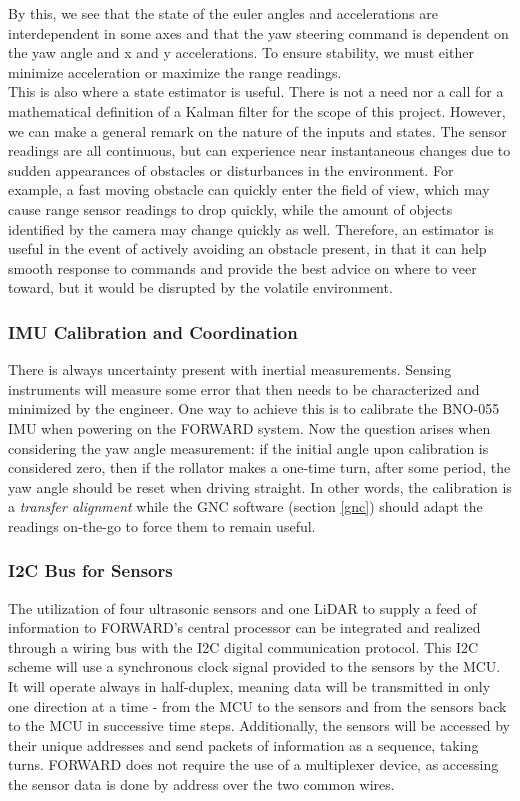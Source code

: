 \noindent By this, we see that the state of the euler angles and accelerations are interdependent in some axes and that the yaw steering command is dependent on the yaw angle and x and y accelerations. To ensure stability, we must either minimize acceleration or maximize the range readings.\\

\noindent This is also where a state estimator is useful. There is not a need nor a call for a mathematical definition of a Kalman filter for the scope of this project. However, we can make a general remark on the nature of the inputs and states. The sensor readings are all continuous, but can experience near instantaneous changes due to sudden appearances of obstacles or disturbances in the environment. For example, a fast moving obstacle can quickly enter the field of view, which may cause range sensor readings to drop quickly, while the amount of objects identified by the camera may change quickly as well. Therefore, an estimator is useful in the event of actively avoiding an obstacle present, in that it can help smooth response to commands and provide the best advice on where to veer toward, but it would be disrupted by the volatile environment.\\

\subsubsection{IMU Calibration and Coordination}
\noindent There is always uncertainty present with inertial measurements. Sensing instruments will measure some error that then needs to be characterized and minimized by the engineer. One way to achieve this is to calibrate the BNO-055 IMU when powering on the FORWARD system. Now the question arises when considering the yaw angle measurement: if the initial angle upon calibration is considered zero, then if the rollator makes a one-time turn, after some period, the yaw angle should be reset when driving straight. In other words, the calibration is a \textit{transfer alignment} while the GNC software (section \ref{gnc}) should adapt the readings on-the-go to force them to remain useful.\\

\subsubsection{I2C Bus for Sensors}
\noindent The utilization of four ultrasonic sensors and one LiDAR to supply a feed of information to FORWARD's central processor can be integrated and realized through a wiring bus with the I2C digital communication protocol. This I2C scheme will use a synchronous clock signal provided to the sensors by the MCU. It will operate always in half-duplex, meaning data will be transmitted in only one direction at a time - from the MCU to the sensors and from the sensors back to the MCU in successive time steps. Additionally, the sensors will be accessed by their unique addresses and send packets of information as a sequence, taking turns. FORWARD does not require the use of a multiplexer device, as accessing the sensor data is done by address over the two common wires.\\